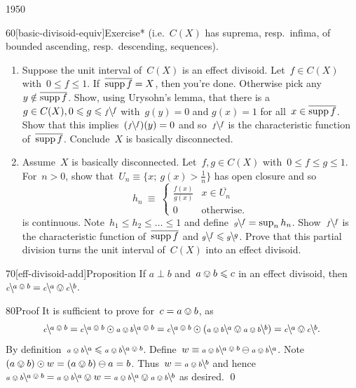 \begin{parsec}{1950}
\begin{point}{60}[basic-divisoid-equiv]{Exercise*}
    (i.e.~$C(X)$ has suprema, resp.~infima, of
            bounded ascending, resp.~descending, sequences).
\begin{enumerate}
\item
    Suppose the unit interval of~$C(X)$ is an effect divisoid.
        Let~$f \in C(X)$ with~$0 \leq f \leq 1$.
    If~$\overline{\supp f} = X$, then you're done.
        Otherwise pick any~$y \notin \overline{\supp f}$.
    Show, using Urysohn's lemma,
    that there is a~$g \in C(X), 0\leq g \leq \rfrac{f}{f}$
    with~$g(y) = 0$ and $g(x) = 1$ for all~$x \in \overline{\supp f}$.
    Show that this implies~$(\rfrac{f}{f})(y) = 0$
        and so~$\rfrac{f}{f}$ is the characteristic function
    of~$\overline{\supp f}$.  Conclude~$X$ is basically disconnected.
\item
Assume~$X$ is basically disconnected.
Let~$f,g\in C(X)$ with~$0 \leq f \leq g \leq 1$.
For~$n > 0$,
show that~$U_n \equiv \{ x;\ g(x) > \frac{1}{n} \}$
has open closure and so
\begin{equation*}
    h_n \ \equiv \  \begin{cases}
        \frac{f(x)}{g(x)} & x \in \overline{U_n}\\
        0 & \text{otherwise}.
    \end{cases}
\end{equation*}
is continuous.
Note~$h_1 \leq h_2 \leq \ldots \leq 1$
    and define~$\rfrac{f}{g} = \sup_n h_n$.
Show~$\rfrac{f}{f}$ is the characteristic function
    of~$\overline{\supp f}$ and
    $\rfrac{f}{g} \leq \rfrac{g}{g}$.
Prove that this partial division turns the unit interval of~$C(X)$
    into an effect divisoid.
\end{enumerate}
\spacingfix{}

\end{point}
\begin{point}{70}[eff-divisoid-add]{Proposition}%
If $a \perp b$ and~$a \ovee b \leq c$ in an effect divisoid,
then~$\rfrac{a \ovee b}{c } = \rfrac{a}{c} \ovee \rfrac{b}{c}$.
\begin{point}{80}{Proof}%
It is sufficient to prove for~$c=a\ovee b$, as
\begin{equation*}
\rfrac{a \ovee b}{c}
    = \rfrac{a \ovee b}{c} \odot \rfrac{a \ovee b}{a \ovee b}
    = \rfrac{a \ovee b}{c} \odot
        \left( \rfrac{a}{a \ovee b} \ovee \rfrac{b}{a \ovee b}  \right)
        = \rfrac{a}{c} \ovee \rfrac{b}{c}.
\end{equation*}
By definition~$\rfrac{a}{a \ovee b} \leq \rfrac{a\ovee b}{a \ovee b}$.
Define~$w \equiv \rfrac{a \ovee b}{a \ovee b} \ominus \rfrac{a}{a \ovee b}$.
Note~$(a\ovee b) \odot w = (a \ovee b) \ominus a = b$.
Thus~$ w = \rfrac{b}{a \ovee b}$
    and hence~$
    \rfrac{a \ovee b}{a\ovee b} 
        = \rfrac{a}{a\ovee b} \ovee w
        = \rfrac{a}{a\ovee b} \ovee \rfrac{b}{a \ovee b}$ as desired.
\qed
\end{point}
\end{point}
\end{parsec}


